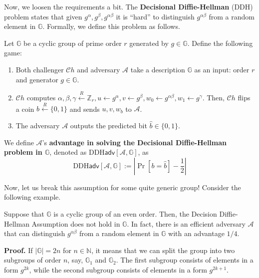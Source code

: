 \documentclass[../lecture-notes.tex]{subfiles}
\begin{document}
Now, we loosen the requirements a bit. The \textbf{Decisional Diffie-Hellman} (DDH) problem states that given $g^{\alpha},g^{\beta},g^{\alpha\beta}$ it is ``hard'' to distinguish $g^{\alpha\beta}$ from a random element in $\mathbb{G}$. Formally, we define this problem as follows.

\begin{definition}
    Let $\mathbb{G}$ be a cyclic group of prime order $r$ generated by $g \in \mathbb{G}$. Define the following game:
    \begin{enumerate}
        \item Both challenger $\mathcal{C}h$ and adversary $\mathcal{A}$ take a description $\mathbb{G}$ as an input: order $r$ and generator $g \in \mathbb{G}$.
        \item $\mathcal{C}h$ computes $\alpha, \beta,\gamma \xleftarrow{R} \mathbb{Z}_r, u \gets g^{\alpha}, v \gets g^{\beta}, w_0 \gets g^{\alpha\beta}, w_1 \gets g^{\gamma}$. Then, $\mathcal{C}h$ flips a coin $b \xleftarrow{R} \{0,1\}$ and sends $u,v,w_b$ to $\mathcal{A}$.
        \item The adversary $\mathcal{A}$ outputs the predicted bit $\hat{b} \in \{0,1\}$.
    \end{enumerate}

    We define $\mathcal{A}$'s \textbf{advantage in solving the Decisional Diffie-Hellman problem in $\mathbb{G}$}, denoted as $\text{DDH}\mathsf{adv}[\mathcal{A},\mathbb{G}]$, as
    \begin{equation}
        \text{DDH}\mathsf{adv}[\mathcal{A},\mathbb{G}] := \left| \Pr[b = \hat{b}] - \frac{1}{2} \right|
    \end{equation}
\end{definition}

Now, let us break this assumption for some quite generic group! Consider the following example.

\begin{theorem}
    Suppose that $\mathbb{G}$ is a cyclic group of an even order. Then, the Decision
    Diffie-Hellman Assumption does not hold in $\mathbb{G}$. In fact, there is an efficient adversary $\mathcal{A}$ that can distinguish $g^{\alpha\beta}$ from a random element in $\mathbb{G}$ with an advantage $1/4$.
\end{theorem}

\textbf{Proof.} If $|\mathbb{G}|=2n$ for $n \in \mathbb{N}$, it means that we can split the group into two subgroups of order $n$, say, $\mathbb{G}_1$ and $\mathbb{G}_2$. The first subgroup consists of elements in a form $g^{2k}$, while the second subgroup consists of elements in a form $g^{2k+1}$.
\end{document}
